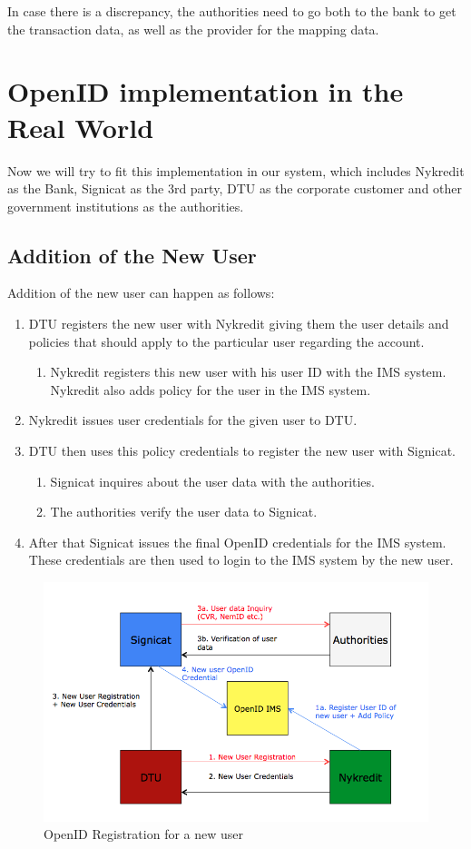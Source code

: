 In case there is a discrepancy, the authorities need to go both to the bank to get the transaction data, as well as the provider for the mapping data.
\section {OpenID implementation in the Real World}
Now we will try to fit this implementation in our system, which includes Nykredit as the Bank, Signicat as the 3rd party, DTU as the corporate customer and other government institutions as the authorities.
\subsection{Addition of the New User}
Addition of the new user can happen as follows:
\begin{enumerate}
	\item DTU registers the new user with Nykredit giving them the user details and policies that should apply to the particular user regarding the account. 
	\begin{enumerate}
		\item Nykredit registers this new user with his user ID with the IMS system. Nykredit also adds policy for the user in the IMS system.
	\end{enumerate}
	\item Nykredit issues user credentials for the given user to DTU.
	\item DTU then uses this policy credentials to register the new user with Signicat. 
	\begin{enumerate}
		\item Signicat inquires about the user data with the authorities.
		\item The authorities verify the user data to Signicat.
	\end{enumerate}
	\item After that Signicat issues the final OpenID credentials for the IMS system.  These credentials are then used to login to the IMS system by the new user.
\end{enumerate}
\begin{figure}[h]
	\centering
	\includegraphics[width=\textwidth]{figures/OpenID-Real}
	\caption{OpenID Registration for a new user}
	\label{fig:OpenID-Real}
\end{figure}

